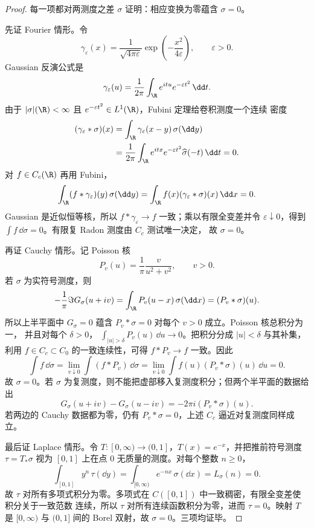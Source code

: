 \begin{proof}
每一项都对两测度之差 $\sigma$ 证明：相应变换为零蕴含 $\sigma=0$。

先证 Fourier 情形。令
\[
 \gamma_\varepsilon(x)=\frac1{\sqrt{4\pi\varepsilon}}
 \exp\!\left(-\frac{x^2}{4\varepsilon}\right),
 \qquad \varepsilon>0.
\]
Gaussian 反演公式是
\[
 \gamma_\varepsilon(u)=\frac1{2\pi}
 \int_\R e^{itu}e^{-\varepsilon t^2}\,\dd t.
\]
由于 $|\sigma|(\R)<\infty$ 且 $e^{-\varepsilon t^2}\in L^1(\R)$，Fubini 定理给卷积测度一个连续
密度
\begin{align*}
 (\gamma_\varepsilon*\sigma)(x)
 &=\int_\R\gamma_\varepsilon(x-y)\,\sigma(\dd y)\\
 &=\frac1{2\pi}\int_\R e^{itx}e^{-\varepsilon t^2}
   \widehat\sigma(-t)\,\dd t=0.
\end{align*}
对 $f\in C_c(\R)$ 再用 Fubini，
\[
 \int_\R(f*\gamma_\varepsilon)(y)\,\sigma(\dd y)
 =\int_\R f(x)(\gamma_\varepsilon*\sigma)(x)\,\dd x=0.
\]
Gaussian 是近似恒等核，所以 $f*\gamma_\varepsilon\to f$ 一致；乘以有限全变差并令
$\varepsilon\downarrow0$，得到 $\int f\,\dd\sigma=0$。有限复 Radon 测度由 $C_c$ 测试唯一决定，
故 $\sigma=0$。

再证 Cauchy 情形。记 Poisson 核
\[
 P_v(u)=\frac1\pi\frac{v}{u^2+v^2},\qquad v>0.
\]
若 $\sigma$ 为实符号测度，则
\begin{equation}\label{eq:7-3-cauchy-poisson-boundary}
 -\frac1\pi\Im G_\sigma(u+iv)
 =\int_\R P_v(u-x)\,\sigma(\dd x)=(P_v*\sigma)(u).
\end{equation}
所以上半平面中 $G_\sigma=0$ 蕴含 $P_v*\sigma=0$ 对每个 $v>0$ 成立。Poisson 核总积分为一，
并且对每个 $\delta>0$，
$\int_{|u|>\delta}P_v(u)\,\dd u\to0$。把积分分成 $|u|<\delta$ 与其补集，利用
$f\in C_c\subset C_0$ 的一致连续性，可得 $f*P_v\to f$ 一致。因此
\[
 \int f\,\dd\sigma
 =\lim_{v\downarrow0}\int(f*P_v)\,\dd\sigma
 =\lim_{v\downarrow0}\int f(u)(P_v*\sigma)(u)\,\dd u=0.
\]
故 $\sigma=0$。若 $\sigma$ 为复测度，则不能把虚部移入复测度积分；但两个半平面的数据给出
\[
 G_\sigma(u+iv)-G_\sigma(u-iv)
 =-2\pi i(P_v*\sigma)(u).
\]
若两边的 Cauchy 数据都为零，仍有 $P_v*\sigma=0$，上述 $C_c$ 逼近对复测度同样成立。

最后证 Laplace 情形。令 $T:[0,\infty)\to(0,1]$，$T(x)=e^{-x}$，并把推前符号测度
$\tau=T_*\sigma$ 视为 $[0,1]$ 上在点 $0$ 无质量的测度。对每个整数 $n\geq0$，
\[
 \int_{[0,1]}y^n\,\tau(\dd y)
 =\int_{[0,\infty)}e^{-nx}\,\sigma(\dd x)=L_\sigma(n)=0.
\]
故 $\tau$ 对所有多项式积分为零。多项式在 $C([0,1])$ 中一致稠密，有限全变差使积分关于一致范数
连续，所以 $\tau$ 对所有连续函数积分为零，进而 $\tau=0$。映射 $T$ 是
$[0,\infty)$ 与 $(0,1]$ 间的 Borel 双射，故 $\sigma=0$。三项均证毕。
\end{proof}

